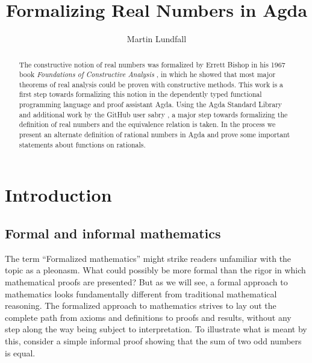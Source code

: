 \documentclass[11pt,a4paper]{article}
\title{Formalizing Real Numbers in Agda}
\author{Martin Lundfall}
\begin{document}
\maketitle
\begin{abstract}
The constructive notion of real numbers was formalized by Errett Bishop in his 1967 book \textit{Foundations of Constructive Analysis} \cite{bishop:85}, in which he showed that most major theorems of real analysis could be proven with constructive methods. This work is a first step towards formalizing this notion in the dependently typed functional programming language and proof assistant Agda. Using the Agda Standard Library and additional work by the GitHub user sabry \cite{sabry}, a major step towards formalizing the definition of real numbers and the equivalence relation is taken. In the process we present an alternate definition of rational numbers in Agda and prove some important statements about functions on rationals.
\end{abstract}
\begin{comment}
n\begin{abstract}
The decentralized infrastructure of the block chain technology Ethereum opens a new set of possibilities for sharing content in a programmable environment. In particular, it is highly suitable for creating a standard library of formalized mathematics to which everyone can add contributions. The database can in theory be automatically checked for validity and to avoid unnecessary repetitions, scanned for relevant results, or even serve as an interactive foundation of a formalized structure of knowledge. The trust-less nature of Ethereum allows communities to make democratic decisions on what contributions should be included in the database, or place bounties on particularly sought functions or proofs.
\end{abstract}
\end{comment}
\clearpage
\tableofcontents{}
\clearpage
\section{Introduction}\label{sec: Introduction}
\subsection{Formal and informal mathematics}\label{subsec: formal & informal}
The term ``Formalized mathematics'' might strike readers unfamiliar with the topic as a pleonasm. What could possibly be more formal than the rigor in which mathematical proofs are presented? But as we will see, a formal approach to mathematics looks fundamentally different from traditional mathematical reasoning. The formalized approach to mathematics strives to lay out the complete path from axioms and definitions to proofs and results, without any step along the way being subject to interpretation. To illustrate what is meant by this, consider a simple informal proof showing that the sum of two odd numbers is equal.
\end{document}
